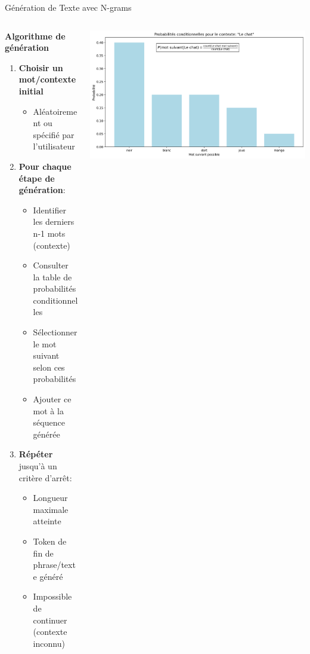\documentclass[aspectratio=169,11pt]{beamer}
\begin{document}
\begin{frame}{Génération de Texte avec N-grams}
    \begin{columns}
        \begin{column}{0.55\textwidth}
            \textbf{Algorithme de génération}
            \begin{enumerate}
                \item \textbf{Choisir un mot/contexte initial}
                \begin{itemize}
                    \item Aléatoirement ou spécifié par l'utilisateur
                \end{itemize}
                \item \textbf{Pour chaque étape de génération}:
                \begin{itemize}
                    \item Identifier les derniers n-1 mots (contexte)
                    \item Consulter la table de probabilités conditionnelles
                    \item Sélectionner le mot suivant selon ces probabilités
                    \item Ajouter ce mot à la séquence générée
                \end{itemize}
                \item \textbf{Répéter} jusqu'à un critère d'arrêt:
                \begin{itemize}
                    \item Longueur maximale atteinte
                    \item Token de fin de phrase/texte généré
                    \item Impossible de continuer (contexte inconnu)
                \end{itemize}
            \end{enumerate}
        \end{column}
        \begin{column}{0.45\textwidth}
            \includegraphics[width=\textwidth]{images/generated/ngram_generation.png}

\end{column}
\end{columns}
\end{frame}
\end{document}
